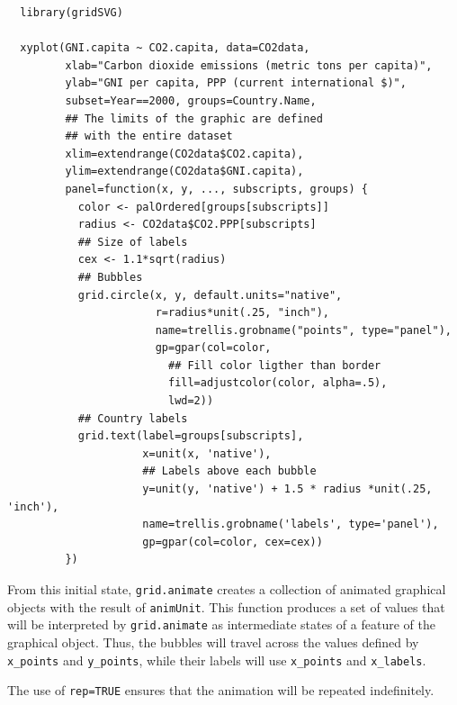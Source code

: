 \lstset{language=r,label= ,caption= ,captionpos=b,numbers=none}
\begin{lstlisting}
  library(gridSVG)
  
  xyplot(GNI.capita ~ CO2.capita, data=CO2data,
         xlab="Carbon dioxide emissions (metric tons per capita)",
         ylab="GNI per capita, PPP (current international $)",
         subset=Year==2000, groups=Country.Name,
         ## The limits of the graphic are defined
         ## with the entire dataset
         xlim=extendrange(CO2data$CO2.capita),
         ylim=extendrange(CO2data$GNI.capita),
         panel=function(x, y, ..., subscripts, groups) {
           color <- palOrdered[groups[subscripts]]
           radius <- CO2data$CO2.PPP[subscripts]
           ## Size of labels
           cex <- 1.1*sqrt(radius)
           ## Bubbles
           grid.circle(x, y, default.units="native",
                       r=radius*unit(.25, "inch"),
                       name=trellis.grobname("points", type="panel"),
                       gp=gpar(col=color,
                         ## Fill color ligther than border
                         fill=adjustcolor(color, alpha=.5),
                         lwd=2))
           ## Country labels
           grid.text(label=groups[subscripts],
                     x=unit(x, 'native'),
                     ## Labels above each bubble
                     y=unit(y, 'native') + 1.5 * radius *unit(.25, 'inch'),
                     name=trellis.grobname('labels', type='panel'),
                     gp=gpar(col=color, cex=cex))
         })
\end{lstlisting}

From this initial state, \texttt{grid.animate} creates a collection of
animated graphical objects with the result of \texttt{animUnit}. This
function produces a set of values that will be interpreted by
\texttt{grid.animate} as intermediate states of a feature of the graphical
object. Thus, the bubbles will travel across the values defined by
\texttt{x\_points} and \texttt{y\_points}, while their labels will use \texttt{x\_points} and
\texttt{x\_labels}.

The use of \texttt{rep=TRUE} ensures that the animation will be repeated
indefinitely.


